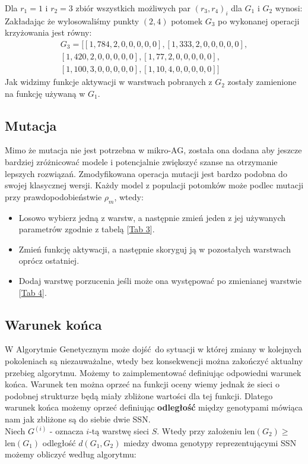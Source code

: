 \documentclass{article}
\begin{document}
Dla $r_1 = 1$ i $r_2 = 3$ zbiór wszystkich możliwych par $(r_3, r_4)_i$ dla $G_1$ i $G_2$ wynosi:
\begin{equation*}
	[(0,2),(0,4),(0,5),(1,2),(1,4),(1,5),(2,4),(2,5),(4,5)]
\end{equation*}
Zakładając że wylosowaliśmy punkty $(2,4)$ potomek $G_3$ po wykonanej operacji krzyżowania
jest równy:
\begin{align*}
	G_3 = \big[[1, 784, 2, 0, 0, 0, 0, 0], [1, 333, 2, 0, 0, 0, 0, 0],\\
	            [1, 420, 2, 0, 0, 0, 0, 0], [1, 77, 2, 0, 0, 0, 0, 0],\\ 
		    [1, 100, 3, 0, 0, 0, 0, 0], [1, 10, 4, 0, 0, 0, 0, 0]\big]
\end{align*}
Jak widzimy funkcje aktywacji w warstwach pobranych z $G_2$ zostały zamienione na funkcję
używaną w $G_1$.\\

\subsection{Mutacja}
Mimo że mutacja nie jest potrzebna w mikro-AG, została ona dodana aby jeszcze bardziej
zróżnicować modele i potencjalnie zwiększyć szanse na otrzymanie lepszych rozwiązań.
Zmodyfikowana operacja mutacji jest bardzo podobna do swojej klasycznej wersji.
Każdy model z populacji potomków może podlec mutacji przy prawdopodobieństwie $\rho_m$, wtedy:
\begin{itemize}
	\item Losowo wybierz jedną z warstw, a następnie zmień jeden z jej używanych parametrów
		zgodnie z tabelą [\hyperref[tab:zakres]{Tab 3}].
	\item Zmień funkcję aktywacji, a następnie skoryguj ją w pozostałych warstwach 
	oprócz ostatniej.
	\item Dodaj warstwę porzucenia jeśli może ona występować po zmienianej warstwie 
	      [\hyperref[tab:rules]{Tab 4}].
\end{itemize}

\subsection{Warunek końca}
W Algorytmie Genetycznym może dojść do sytuacji w której zmiany w kolejnych pokoleniach są
niezauważalne, wtedy bez konsekwencji można zakończyć aktualny przebieg algorytmu. Możemy to
zaimplementować definiując odpowiedni warunek końca. Warunek ten można oprzeć na funkcji oceny
wiemy jednak że sieci o podobnej strukturze będą miały zbliżone wartości dla tej funkcji.
Dlatego warunek końca możemy oprzeć definiując \textbf{odległość} między genotypami mówiąca nam
jak zbliżone są do siebie dwie SSN.\\
Niech $G^{(i)}$ - oznacza $i$-tą warstwę sieci $S$. Wtedy przy założeniu 
len$(G_2) \geq$ len$(G_1)$
odległość $d(G_1, G_2)$ miedzy dwoma genotypy reprezentującymi SSN możemy obliczyć według 
algorytmu:
\end{document}
